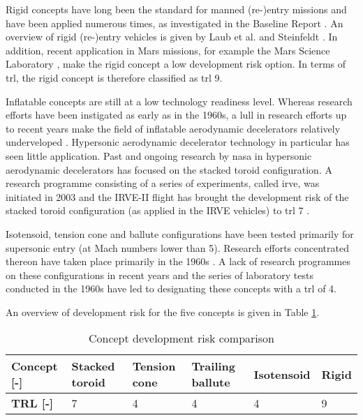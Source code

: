 Rigid concepts have long been the standard for manned (re-)entry missions and have been applied numerous times, as investigated in the Baseline Report \cite[p.2-3]{Balasooriyan2015a}. An overview of rigid (re-)entry vehicles is given by Laub et al. \cite{Laub2004} and Steinfeldt \cite{Steinfeldt2009}. In addition, recent application in Mars missions, for example the Mars Science Laboratory \cite{Schoenenberger2009}, make the rigid concept a low development risk option. In terms of \gls{trl}, the rigid concept is therefore classified as \gls{trl} 9.

Inflatable concepts are still at a low technology readiness level. Whereas research efforts have been instigated as early as in the 1960s, a lull in research efforts up to recent years make the field of inflatable aerodynamic decelerators relatively underveloped \cite{Smith2010}. Hypersonic aerodynamic decelerator technology in particular has seen little application. Past and ongoing research by \gls{nasa} in hypersonic aerodynamic decelerators has focused on the stacked toroid configuration. A research programme consisting of a series of experiments, called \acrfull{irve}, was initiated in 2003 and the IRVE-II flight has brought the development risk of the stacked toroid configuration (as applied in the IRVE vehicles) to \gls{trl} 7 \cite{Player2005}.

Isotensoid, tension cone and ballute configurations have been tested primarily for supersonic entry (at Mach numbers lower than 5). Research efforts concentrated thereon have taken place primarily in the 1960s \cite{Smith2010}. A lack of research programmes on these configurations in recent years and the series of laboratory tests conducted in the 1960s have led to designating these concepts with a \gls{trl} of 4.

An overview of development risk for the five concepts is given in Table \ref{tab:concrisk}.

\begin{table}[h]
\caption{Concept development risk comparison}
\begin{tabular}{|l|l|l|l|l|l|}
\hline
\textbf{Concept {[}-{]}} & Stacked toroid & Tension cone & Trailing ballute & Isotensoid & Rigid \\ \hline
\textbf{TRL {[}-{]}}     & 7              & 4            & 4                & 4          & 9     \\ \hline
\end{tabular}
\label{tab:concrisk}
\end{table}

